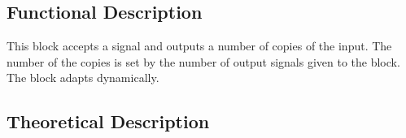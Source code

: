 \begin{refsection}
\subsection*{Functional Description}

This block accepts a signal and outputs a number of copies of the input. The number of the copies is set by the number of output signals given to the block. The block adapts dynamically.

\subsection*{Theoretical Description}\label{bercalc}


\clearpage
\printbibliography[heading=subbibliography]
\end{refsection}
\cleardoublepage
